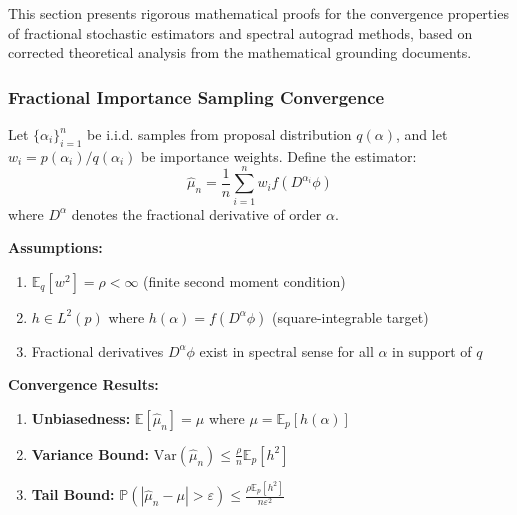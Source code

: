 This section presents rigorous mathematical proofs for the convergence properties of fractional stochastic estimators and spectral autograd methods, based on corrected theoretical analysis from the mathematical grounding documents.

\subsubsection{Fractional Importance Sampling Convergence}

\begin{theorem}
Let $\{\alpha_i\}_{i=1}^n$ be i.i.d. samples from proposal distribution $q(\alpha)$, and let $w_i = p(\alpha_i)/q(\alpha_i)$ be importance weights. Define the estimator:
\begin{equation}
\hat{\mu}_n = \frac{1}{n} \sum_{i=1}^n w_i f(D^{\alpha_i} \phi)
\end{equation}
where $D^{\alpha}$ denotes the fractional derivative of order $\alpha$.

\textbf{Assumptions:}
\begin{enumerate}
\item $\mathbb{E}_q[w^2] = \rho < \infty$ (finite second moment condition)
\item $h \in L^2(p)$ where $h(\alpha) = f(D^{\alpha}\phi)$ (square-integrable target)
\item Fractional derivatives $D^{\alpha}\phi$ exist in spectral sense for all $\alpha$ in support of $q$
\end{enumerate}

\textbf{Convergence Results:}
\begin{enumerate}
\item \textbf{Unbiasedness:} $\mathbb{E}[\hat{\mu}_n] = \mu$ where $\mu = \mathbb{E}_p[h(\alpha)]$
\item \textbf{Variance Bound:} $\text{Var}(\hat{\mu}_n) \leq \frac{\rho}{n} \mathbb{E}_p[h^2]$
\item \textbf{Tail Bound:} $\mathbb{P}(|\hat{\mu}_n - \mu| > \varepsilon) \leq \frac{\rho \mathbb{E}_p[h^2]}{n \varepsilon^2}$
\end{enumerate}
\end{theorem}

